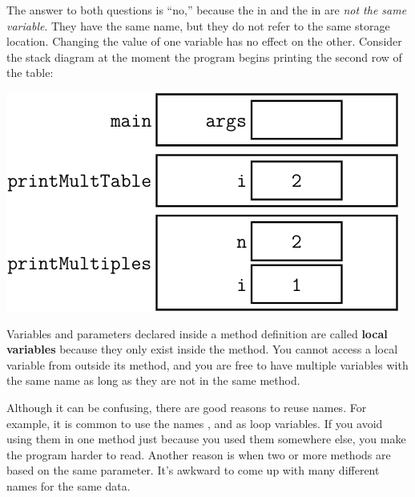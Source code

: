 The answer to both questions is ``no,'' because the  in  and the  in  are {\em not the same variable}.
They have the same name, but they do not refer to the same storage location.
Changing the value of one variable has no effect on the other.
Consider the stack diagram at the moment the program begins printing the second row of the table:

\begin{center}
\vspace{1em}
\includegraphics{figs/stack4.pdf}
\vspace{1em}
\end{center}



Variables and parameters declared inside a method definition are called {\bf local variables} because they only exist inside the method.
You cannot access a local variable from outside its method, and you are free to have multiple variables with the same name as long as they are not in the same method.


Although it can be confusing, there are good reasons to reuse names.
For example, it is common to use the names ,  and  as loop variables.
If you avoid using them in one method just because you used them somewhere else, you make the program harder to read.
Another reason is when two or more methods are based on the same parameter.
It's awkward to come up with many different names for the same data.


